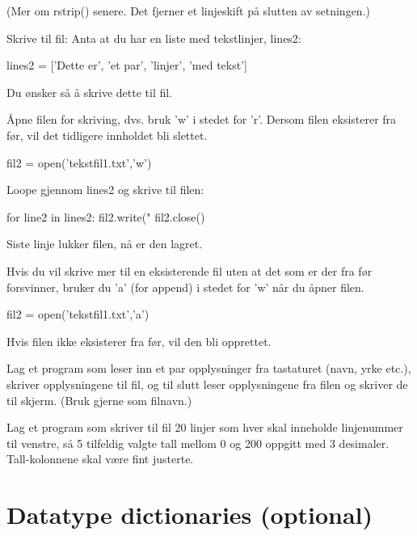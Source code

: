 (Mer om rstrip() senere. Det fjerner et linjeskift på slutten av setningen.)

Skrive til fil: 
Anta at du har en liste med tekstlinjer, lines2:

\begin{usncodebox}
lines2 = ['Dette er', 'et par', 'linjer', 'med tekst']
\end{usncodebox}

Du ønsker så å skrive dette til fil.

Åpne filen for skriving, dvs. bruk 'w' i stedet for 'r'. Dersom filen eksisterer fra før, vil det tidligere innholdet bli slettet.

\begin{usncodebox}
fil2 = open('tekstfil1.txt','w')    
\end{usncodebox}

Loope gjennom lines2 og skrive til filen:
\begin{usncodebox}
for line2 in lines2:
    fil2.write("%
fil2.close()
\end{usncodebox}

Siste linje lukker filen, nå er den lagret. 

Hvis du vil skrive mer til en eksisterende fil uten at det som er der fra før forsvinner, bruker du 'a' (for append) i stedet for 'w' når du åpner filen.

\begin{usncodebox}
fil2 = open('tekstfil1.txt','a')
\end{usncodebox}

Hvis filen ikke eksisterer fra før, vil den bli opprettet. 
 
\begin{exercise}
Lag et program som leser inn et par opplysninger fra tastaturet (navn, yrke etc.), skriver opplysningene til fil, og til slutt leser 
opplysningene fra filen og skriver de til skjerm. (Bruk gjerne  som filnavn.)
\end{exercise}

\begin{exercise}
Lag et program som skriver til fil 20 linjer som hver skal inneholde linjenummer til venstre, så 5 tilfeldig valgte tall mellom 0 og 200 oppgitt med 3 desimaler. Tall-kolonnene skal være fint justerte.
\end{exercise}

\section{Datatype dictionaries (optional)}

